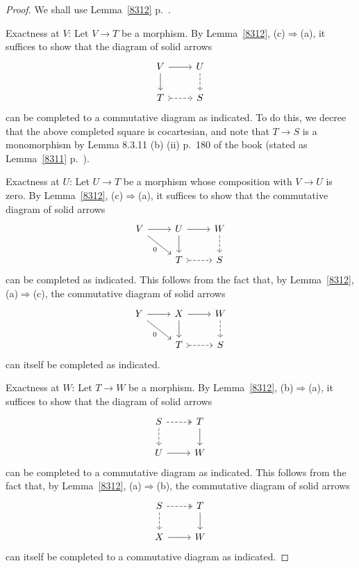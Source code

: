 \documentclass[12pt]{article}%
\theoremstyle{remark}
\theoremstyle{definition}
\newcommand{\nn}{\noindent}
\newcommand{\then}{\Rightarrow}
\begin{document}
\begin{proof}
We shall use Lemma~\ref{8312} p.~\pageref{8312}.

\nn Exactness at $V$: Let $V\to T$ be a morphism. By Lemma~\ref{8312}, (c)$\then$(a), it suffices to show that the diagram of solid arrows 
$$
\begin{tikzcd}
V\ar{r}\ar{d}&U\ar[dashed]{d}\\ 
T\ar[dashed,tail]{r}&S
\end{tikzcd}
$$ 
can be completed to a commutative diagram as indicated. To do this, we decree that the above completed square is cocartesian, and note that $T\to S$ is a monomorphism by Lemma 8.3.11 (b) (ii) p.~180 of the book (stated as Lemma~\ref{8311} p.~\pageref{8311}).

\nn Exactness at $U$: Let $U\to T$ be a morphism whose composition with $V\to U$ is zero. By Lemma~\ref{8312}, (c)$\then$(a), it suffices to show that the commutative diagram of solid arrows 
$$
\begin{tikzcd}
V\ar{r}\ar{dr}[swap]{0}&U\ar{r}\ar{d}&W\ar[dashed]{d}\\ 
{}&T\ar[dashed,tail]{r}&S
\end{tikzcd}
$$ 
can be completed as indicated. This follows from the fact that, by Lemma~\ref{8312}, (a)$\then$(c), the commutative diagram of solid arrows 
$$
\begin{tikzcd}
Y\ar{r}\ar{dr}[swap]{0}&X\ar{r}\ar{d}&W\ar[dashed]{d}\\ 
{}&T\ar[dashed,tail]{r}&S
\end{tikzcd}
$$ 
can itself be completed as indicated.

\nn Exactness at $W$: Let $T\to W$ be a morphism. By Lemma~\ref{8312}, (b)$\then$(a), it suffices to show that the diagram of solid arrows 
$$
\begin{tikzcd}
S\ar[dashed,two heads]{r}\ar[dashed]{d}&T\ar{d}\\ 
U\ar{r}&W
\end{tikzcd}
$$ 
can be completed to a commutative diagram as indicated. This follows from the fact that, by Lemma~\ref{8312}, (a)$\then$(b), the commutative diagram of solid arrows 
$$
\begin{tikzcd}
S\ar[dashed,two heads]{r}\ar[dashed]{d}&T\ar{d}\\ 
X\ar{r}&W
\end{tikzcd}
$$ 
can itself be completed to a commutative diagram as indicated.
\end{proof}
\end{document}
